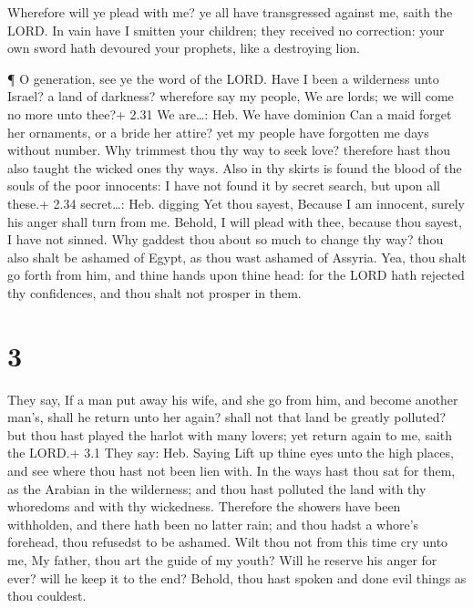  Wherefore will ye plead with me? ye all have transgressed
against me, saith the LORD.  In vain have I smitten your
children; they received no correction: your own sword hath devoured your
prophets, like a destroying lion.

 ¶ O generation, see ye the word of the LORD. Have I been a
wilderness unto Israel? a land of darkness? wherefore say my people, We
are lords; we will come no more unto thee?+ 2.31 We are\ldots: Heb. We
have dominion  Can a maid forget her ornaments, or a bride
her attire? yet my people have forgotten me days without number.
 Why trimmest thou thy way to seek love? therefore hast
thou also taught the wicked ones thy ways.  Also in thy
skirts is found the blood of the souls of the poor innocents: I have not
found it by secret search, but upon all these.+ 2.34 secret\ldots: Heb.
digging  Yet thou sayest, Because I am innocent, surely his
anger shall turn from me. Behold, I will plead with thee, because thou
sayest, I have not sinned.  Why gaddest thou about so much
to change thy way? thou also shalt be ashamed of Egypt, as thou wast
ashamed of Assyria.  Yea, thou shalt go forth from him, and
thine hands upon thine head: for the LORD hath rejected thy confidences,
and thou shalt not prosper in them.

\hypertarget{section-2}{%
\section{3}\label{section-2}}

 They say, If a man put away his wife, and she go from him,
and become another man's, shall he return unto her again? shall not that
land be greatly polluted? but thou hast played the harlot with many
lovers; yet return again to me, saith the LORD.+ 3.1 They say: Heb.
Saying  Lift up thine eyes unto the high places, and see
where thou hast not been lien with. In the ways hast thou sat for them,
as the Arabian in the wilderness; and thou hast polluted the land with
thy whoredoms and with thy wickedness.  Therefore the
showers have been withholden, and there hath been no latter rain; and
thou hadst a whore's forehead, thou refusedst to be ashamed.
 Wilt thou not from this time cry unto me, My father, thou
art the guide of my youth?  Will he reserve his anger for
ever? will he keep it to the end? Behold, thou hast spoken and done evil
things as thou couldest.

